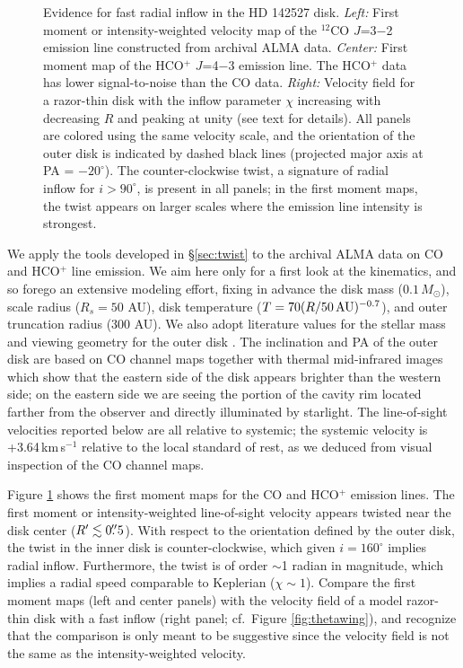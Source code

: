 \begin{figure}[t!]
\caption{Evidence for fast radial inflow in the HD 142527 disk.  {\it Left:} 
First moment or intensity-weighted velocity map of the $^{12}$CO $J$=3$-$2 
emission line constructed from archival ALMA data.  {\it Center:} First moment 
map of the HCO$^+$ $J$=4$-$3 emission line.  The HCO$^+$ data has lower 
signal-to-noise than the CO data.  {\it Right:} Velocity field for a razor-thin 
disk with the inflow parameter $\chi$ increasing with decreasing $R$ and 
peaking at unity (see text for details).  All panels are colored using the same 
velocity scale, and the orientation of the outer disk is indicated by dashed 
black lines (projected major axis at PA = $-20^\circ$).  The counter-clockwise 
twist, a signature of radial inflow for $i > 90^\circ$, is present in all 
panels; in the first moment maps, the twist appears on larger scales where the 
emission line intensity is strongest.  \label{fig:hd142527_moms}}
\end{figure}

We apply the tools developed in \S\ref{sec:twist} to the archival ALMA data on 
CO and HCO$^+$ line emission. We aim here only for a first look at the 
kinematics, and so forego an extensive modeling effort, fixing in advance the 
disk mass ($0.1\,M_\odot$), scale radius ($R_s = 50$ AU), disk temperature ($T 
= 70 (R/50 \,{\rm AU})^{-0.7}$), and outer truncation radius (300 AU).  We also 
adopt literature values for the stellar mass \citep[$M = 
2.7\,M_\odot$;][]{casassus13} and viewing geometry for the outer disk 
\citep[$i = 160^\circ$, with the projected major axis oriented at position 
angle PA = -20$^\circ$;\footnote{Alternatively, if our $x'$-axis points west and 
our $y'$-axis points north, then $\Omega_{\rm outer} = 
70^\circ$.}][]{fujiwara06,verhoeff11}. The inclination and PA of the outer disk
are based on CO channel maps together with thermal mid-infrared images which 
show that the eastern side of the disk appears brighter than the western side;
on the eastern side we are seeing the portion of the cavity rim located farther 
from the observer and directly illuminated by starlight.  The line-of-sight 
velocities reported below are all relative to systemic; the systemic velocity 
is +3.64\,km\,s$^{-1}$ relative to the local standard of rest, as we deduced 
from visual inspection of the CO channel maps.

Figure \ref{fig:hd142527_moms} shows the first moment maps for the CO
and HCO$^+$ emission lines.  The first moment or intensity-weighted
line-of-sight velocity appears twisted near the disk center ($R'
\lesssim 0\mbox{$.\!\!^{\prime\prime}$}5$).  With respect to the orientation defined by the
outer disk, the twist in the inner disk is counter-clockwise, which
given $i=160^\circ$ implies radial inflow.  Furthermore, the twist is of order
$\sim$1 radian in magnitude, which implies a radial speed comparable to 
Keplerian ($\chi \sim 1$).  Compare the first moment maps (left 
and center panels) with the velocity field of a model razor-thin disk with a 
fast inflow (right panel; cf.~Figure \ref{fig:thetawing}), and recognize that 
the comparison is only meant to be suggestive since the velocity field 
is not the same as the intensity-weighted velocity.


